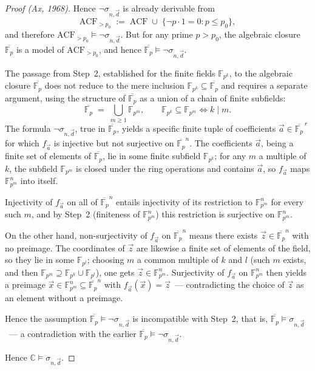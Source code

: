 \documentclass[12pt, a4paper]{article}
\theoremstyle{plain}
\theoremstyle{definition}
\renewcommand{\models}{\vDash}
\begin{document}
\begin{proof}[Proof (Ax, 1968)]
Hence $\neg\sigma_{n,\vec d}$ is already derivable from
\[
  \mathrm{ACF}_{>p_0} \;:=\; \mathrm{ACF} \;\cup\;
  \{\neg p \cdot 1 = 0 : p \le p_0\},
\]
and therefore $\mathrm{ACF}_{>p_0} \models \neg\sigma_{n,\vec d}$.
But for any prime $p > p_0$, the algebraic closure $\overline{\mathbb{F}_p}$
is a model of $\mathrm{ACF}_{>p_0}$, and hence
$\overline{\mathbb{F}_p} \models \neg\sigma_{n,\vec d}$.

The passage from Step~2, established for the finite fields $\mathbb{F}_{p^k}$,
to the algebraic closure $\overline{\mathbb{F}_p}$ does not reduce to the mere
inclusion $\mathbb{F}_{p^k} \subseteq \overline{\mathbb{F}_p}$ and requires a
separate argument, using the structure of $\overline{\mathbb{F}_p}$ as a union
of a chain of finite subfields:
\[
  \overline{\mathbb{F}_p} \;=\; \bigcup_{m \ge 1} \mathbb{F}_{p^m},
  \qquad
  \mathbb{F}_{p^k} \subseteq \mathbb{F}_{p^m} \iff k \mid m.
\]
The formula $\neg\sigma_{n,\vec d}$, true in $\overline{\mathbb{F}_p}$, yields
a specific finite tuple of coefficients $\vec a \in \overline{\mathbb{F}_p}^{\,r}$
for which $f_{\vec a}$ is injective but not surjective on
$\overline{\mathbb{F}_p}^n$. The coefficients $\vec a$, being a finite set of
elements of $\overline{\mathbb{F}_p}$, lie in some finite subfield
$\mathbb{F}_{p^k}$; for any $m$ a multiple of $k$, the subfield
$\mathbb{F}_{p^m}$ is closed under the ring operations and contains $\vec a$,
so $f_{\vec a}$ maps $\mathbb{F}_{p^m}^n$ into itself.

Injectivity of $f_{\vec a}$ on all of $\overline{\mathbb{F}_p}^n$ entails
injectivity of its restriction to $\mathbb{F}_{p^m}^n$ for every such $m$,
and by Step~2 (finiteness of $\mathbb{F}_{p^m}^n$) this restriction is
surjective on $\mathbb{F}_{p^m}^n$.

On the other hand, non-surjectivity of $f_{\vec a}$ on $\overline{\mathbb{F}_p}^n$
means there exists $\vec z \in \overline{\mathbb{F}_p}^n$ with no preimage.
The coordinates of $\vec z$ are likewise a finite set of elements of the
field, so they lie in some $\mathbb{F}_{p^l}$; choosing $m$ a common
multiple of $k$ and $l$ (such $m$ exists, and then $\mathbb{F}_{p^m} \supseteq
\mathbb{F}_{p^k} \cup \mathbb{F}_{p^l}$), one gets $\vec z \in \mathbb{F}_{p^m}^n$.
Surjectivity of $f_{\vec a}$ on $\mathbb{F}_{p^m}^n$ then yields a preimage
$\vec x \in \mathbb{F}_{p^m}^n \subseteq \overline{\mathbb{F}_p}^n$ with
$f_{\vec a}(\vec x) = \vec z$~--- contradicting the choice of $\vec z$ as an
element without a preimage.

Hence the assumption $\overline{\mathbb{F}_p} \models \neg\sigma_{n,\vec d}$
is incompatible with Step~2, that is,
$\overline{\mathbb{F}_p} \models \sigma_{n,\vec d}$~--- a contradiction
with the earlier $\overline{\mathbb{F}_p} \models \neg\sigma_{n,\vec d}$.

Hence $\mathbb{C} \models \sigma_{n,\vec d}$.
\end{proof}
\end{document}

